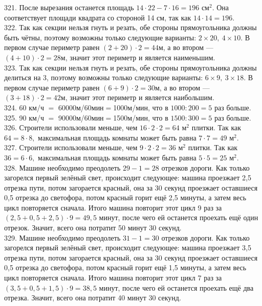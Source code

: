 \documentclass[12pt]{article}
\begin{document}
321. После вырезания останется площадь $14\cdot22-7\cdot16=196\text{ см}^2.$ Она соответствует площади квадрата со стороной 14 см, так как $14\cdot 14=196.$\\
322. Так как секции нельзя гнуть и резать, обе стороны прямоугольника должны быть чётны, поэтому возможны только следующие варианты: $2\times20,\ 4\times10.$  В первом случае периметр равен $(2+20)\cdot2=44$м, а во втором --- $(4+10)\cdot2=28$м, значит этот периметр и является наименьшим.\\
323. Так как секции нельзя гнуть и резать, обе стороны прямоугольника должны делиться на 3, поэтому возможны только следующие варианты: $6\times9,\ 3\times18.$ В первом случае периметр равен $(6+9)\cdot2=30$м, а во втором --- $(3+18)\cdot2=42$м, значит этот периметр и является наибольшим.\\
324. 60 км/ч $=$ 60000м/60мин$=$1000м/мин, что в $1000:200=5$ раз больше.\\
325. 90 км/ч $=$ 90000м/60мин$=$1500м/мин, что в $1500:300=5$ раз больше.\\
326. Строители использовали меньше, чем $16\cdot2\cdot2=64\text{ м}^2$ плитки. Так как $64=8\cdot8,$ максимальная площадь комнаты может быть равна $7\cdot7=49\text{ м}^2.$\\
327. Строители использовали меньше, чем $9\cdot2\cdot2=36\text{ м}^2$ плитки. Так как $36=6\cdot6,$ максимальная площадь комнаты может быть равна $5\cdot5=25\text{ м}^2.$\\
328. Машине необходимо преодолеть $29-1=28$ отрезков  дороги. Как только загорелся первый зелёный свет, происходит следующее: машина проезжает 2,5 отрезка пути, потом загорается красный, она за 30 секунд проезжает оставшиеся 0,5 отрезка до светофора, потом красный горит ещё 2,5 минуты, а затем весь цикл повторяется сначала. Итого машина повторит этот цикл 9 раз за $(2,5+0,5+2,5)\cdot9=49,5$ минут, после чего ей останется проехать ещё один отрезок. Значит, всего она потратит 50 минут 30 секунд.\\
329. Машине необходимо преодолеть $31-1=30$ отрезков  дороги. Как только загорелся первый зелёный свет, происходит следующее: машина проезжает 3,5 отрезка пути, потом загорается красный, она за 30 секунд проезжает оставшиеся 0,5 отрезка до светофора, потом красный горит ещё 1,5 минуты, а затем весь цикл повторяется сначала. Итого машина повторит этот цикл 7 раз за $(3,5+0,5+1,5)\cdot9=38,5$ минут, после чего ей останется проехать ещё два отрезка. Значит, всего она потратит 40 минут 30 секунд.\\
\end{document}
